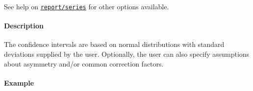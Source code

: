 See help on \href{report/series}{\texttt{report/series}} for other
options available.

\paragraph{Description}\label{description}

The confidence intervals are based on normal distributions with standard
deviations supplied by the user. Optionally, the user can also specify
assumptions about asymmetry and/or common correction factors.

\paragraph{Example}\label{example}


